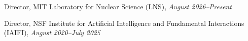 \bbl
\item Director, MIT Laboratory for Nuclear Science (LNS), \textit{August 2026--Present}
\item Director, NSF Institute for Artificial Intelligence and Fundamental Interactions (IAIFI), \textit{August 2020--July 2025}
\el
